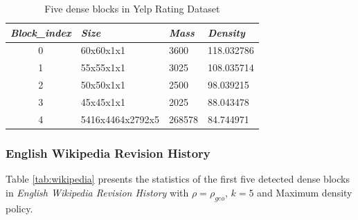 \renewcommand{\arraystretch}{1.5}
\begin{table}[h!t]
\centering
\caption{Five dense blocks in Yelp Rating Dataset}
\label{tab:yelp}
\begin{tabular}{|c|p{4cm}|p{2cm}|p{3cm}|}
\hline
\textit{\textbf{Block\_index}} & \textit{\textbf{Size}} & \textit{\textbf{Mass}} & \textit{\textbf{Density}} \\ \hline
{0}                     & 60x60x1x1                 & 3600                               & 118.032786                           \\ \hline
{1}                     & 55x55x1x1                 & 3025                               & 108.035714                           \\ \hline
{2}                     & 50x50x1x1                 & 2500                               & 98.039215                           \\ \hline
{3}                     & 45x45x1x1                  & 2025                                & 88.043478                           \\ \hline
{4}                     & 5416x4464x2792x5                 & 268578                                & 84.744971                           \\ \hline
\end{tabular}
\end{table}



\subsubsection{English Wikipedia Revision History}

Table \ref{tab:wikipedia} presents the statistics of the first five detected dense blocks in \textit{English Wikipedia Revision History} with $\rho=\rho_{geo}$, $k=5$ and Maximum density policy.  



